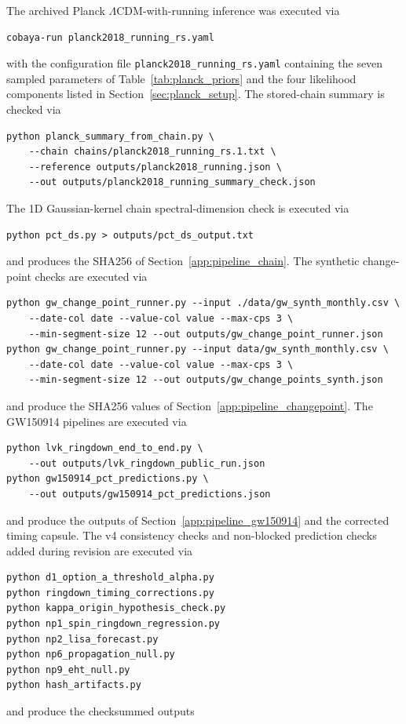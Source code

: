 ﻿\documentclass[12pt,a4paper]{article}
\theoremstyle{definition}
\begin{document}
The archived Planck $\Lambda$CDM-with-running inference was executed via
\begin{verbatim}
cobaya-run planck2018_running_rs.yaml
\end{verbatim}
with the configuration file \texttt{planck2018\_running\_rs.yaml} containing the seven sampled parameters of Table~\ref{tab:planck_priors} and the four likelihood components listed in Section~\ref{sec:planck_setup}. The stored-chain summary is checked via
\begin{verbatim}
python planck_summary_from_chain.py \
    --chain chains/planck2018_running_rs.1.txt \
    --reference outputs/planck2018_running.json \
    --out outputs/planck2018_running_summary_check.json
\end{verbatim}
The 1D Gaussian-kernel chain spectral-dimension check is executed via
\begin{verbatim}
python pct_ds.py > outputs/pct_ds_output.txt
\end{verbatim}
and produces the SHA256 of Section~\ref{app:pipeline_chain}. The synthetic change-point checks are executed via
\begin{verbatim}
python gw_change_point_runner.py --input ./data/gw_synth_monthly.csv \
    --date-col date --value-col value --max-cps 3 \
    --min-segment-size 12 --out outputs/gw_change_point_runner.json
python gw_change_point_runner.py --input data/gw_synth_monthly.csv \
    --date-col date --value-col value --max-cps 3 \
    --min-segment-size 12 --out outputs/gw_change_points_synth.json
\end{verbatim}
and produce the SHA256 values of Section~\ref{app:pipeline_changepoint}. The GW150914 pipelines are executed via
\begin{verbatim}
python lvk_ringdown_end_to_end.py \
    --out outputs/lvk_ringdown_public_run.json
python gw150914_pct_predictions.py \
    --out outputs/gw150914_pct_predictions.json
\end{verbatim}
and produce the outputs of Section~\ref{app:pipeline_gw150914} and the corrected timing capsule. The v4 consistency checks and non-blocked prediction checks added during revision are executed via
\begin{verbatim}
python d1_option_a_threshold_alpha.py
python ringdown_timing_corrections.py
python kappa_origin_hypothesis_check.py
python np1_spin_ringdown_regression.py
python np2_lisa_forecast.py
python np6_propagation_null.py
python np9_eht_null.py
python hash_artifacts.py
\end{verbatim}
and produce the checksummed outputs
\end{document}
